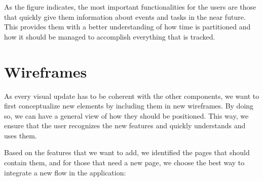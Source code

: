 As the figure indicates, the most important functionalities for the users are those that quickly give them information about events and tasks in the near future. This provides them with a better understanding of how time is partitioned and how it should be managed to accomplish everything that is tracked.

\section{Wireframes} \label{5:Wireframes}

As every visual update has to be coherent with the other components, we want to first conceptualize new elements by including them in new wireframes. By doing so, we can have a general view of how they should be positioned.
This way, we ensure that the user recognizes the new features and quickly understands and uses them. 

Based on the features that we want to add, we identified the pages that should contain them, and for those that need a new page, we choose the best way to integrate a new flow in the application:

